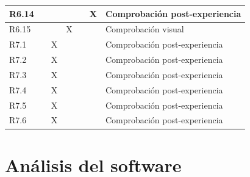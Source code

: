 \begin{longtable}[c]{@{}lllllll@{}}
\multicolumn{1}{|l|}{R6.14} & \multicolumn{1}{l|}{} & \multicolumn{1}{l|}{} & \multicolumn{1}{l|}{} & \multicolumn{1}{l|}{} & \multicolumn{1}{l|}{X} & \multicolumn{1}{l|}{Comprobación post-experiencia} \\* \midrule
\multicolumn{1}{|l|}{R6.15} & \multicolumn{1}{l|}{} & \multicolumn{1}{l|}{} & \multicolumn{1}{l|}{X} & \multicolumn{1}{l|}{} & \multicolumn{1}{l|}{} & \multicolumn{1}{l|}{Comprobación visual} \\* \midrule
\multicolumn{1}{|l|}{R7.1} & \multicolumn{1}{l|}{} & \multicolumn{1}{l|}{X} & \multicolumn{1}{l|}{} & \multicolumn{1}{l|}{} & \multicolumn{1}{l|}{} & \multicolumn{1}{l|}{Comprobación post-experiencia} \\* \midrule
\multicolumn{1}{|l|}{R7.2} & \multicolumn{1}{l|}{} & \multicolumn{1}{l|}{X} & \multicolumn{1}{l|}{} & \multicolumn{1}{l|}{} & \multicolumn{1}{l|}{} & \multicolumn{1}{l|}{Comprobación post-experiencia} \\* \midrule
\multicolumn{1}{|l|}{R7.3} & \multicolumn{1}{l|}{} & \multicolumn{1}{l|}{X} & \multicolumn{1}{l|}{} & \multicolumn{1}{l|}{} & \multicolumn{1}{l|}{} & \multicolumn{1}{l|}{Comprobación post-experiencia} \\* \midrule
\multicolumn{1}{|l|}{R7.4} & \multicolumn{1}{l|}{} & \multicolumn{1}{l|}{X} & \multicolumn{1}{l|}{} & \multicolumn{1}{l|}{} & \multicolumn{1}{l|}{} & \multicolumn{1}{l|}{Comprobación post-experiencia} \\* \midrule
\multicolumn{1}{|l|}{R7.5} & \multicolumn{1}{l|}{} & \multicolumn{1}{l|}{X} & \multicolumn{1}{l|}{} & \multicolumn{1}{l|}{} & \multicolumn{1}{l|}{} & \multicolumn{1}{l|}{Comprobación post-experiencia} \\* \midrule
\multicolumn{1}{|l|}{R7.6} & \multicolumn{1}{l|}{} & \multicolumn{1}{l|}{X} & \multicolumn{1}{l|}{} & \multicolumn{1}{l|}{} & \multicolumn{1}{l|}{} & \multicolumn{1}{l|}{Comprobación post-experiencia} \\* \bottomrule
\end{longtable}





\section{Análisis del software}
 
